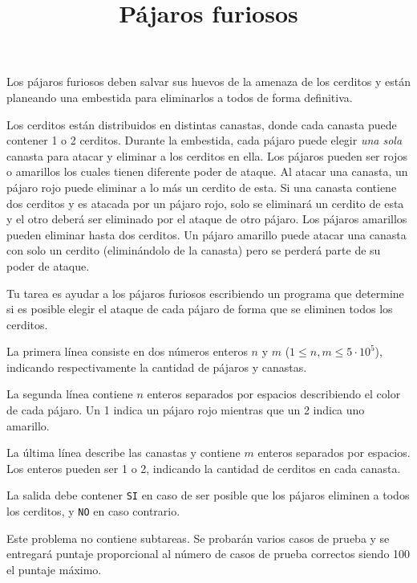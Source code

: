 \documentclass{oci}
\title{Pájaros furiosos}
\begin{document}
\begin{problemDescription}
Los pájaros furiosos deben salvar sus huevos de la amenaza de los
cerditos y están planeando una embestida
para eliminarlos a todos de forma definitiva.

Los cerditos están distribuidos en distintas canastas, donde cada
canasta puede contener 1 o 2 cerditos.
Durante la embestida, cada pájaro puede elegir \emph{una sola} canasta para
atacar y eliminar a los cerditos en ella.
Los pájaros pueden ser rojos o amarillos los cuales tienen
diferente poder de ataque.
Al atacar una canasta, un pájaro rojo puede eliminar a lo más un
cerdito de esta.
Si una canasta contiene dos cerditos y es atacada por un pájaro rojo,
solo se eliminará un cerdito de esta y el otro deberá ser eliminado por
el ataque de otro pájaro.
Los pájaros amarillos pueden eliminar hasta dos cerditos.
Un pájaro amarillo puede atacar una canasta con solo un cerdito
(eliminándolo de la canasta) pero se perderá parte de su poder
de ataque.

Tu tarea es ayudar a los pájaros furiosos escribiendo un programa
que determine si es posible elegir el ataque de cada pájaro de forma
que se eliminen todos los cerditos.
\end{problemDescription}

\begin{inputDescription}
	La primera línea consiste en dos números enteros $n$ y $m$ ($1 \leq n, m \leq 5 \cdot 10^5$),
	indicando respectivamente la cantidad de pájaros y canastas.

	La segunda línea contiene $n$ enteros separados por espacios describiendo
	el color de cada pájaro.
	Un 1 indica un pájaro rojo mientras que un 2 indica uno amarillo.

	La última línea describe las canastas y contiene $m$ enteros separados por espacios.
	Los enteros pueden ser 1 o 2, indicando la cantidad de cerditos en cada canasta.
\end{inputDescription}

\begin{outputDescription}
	La salida debe contener \texttt{SI} en caso de ser posible que los pájaros
	eliminen a todos los cerditos, y \texttt{NO} en caso contrario.
\end{outputDescription}

\begin{scoreDescription}
Este problema no contiene subtareas.
Se probarán varios casos de prueba y se entregará puntaje proporcional al número
de casos de prueba correctos siendo 100 el puntaje máximo.
\end{scoreDescription}

\begin{sampleDescription}
\end{sampleDescription}
\end{document}
